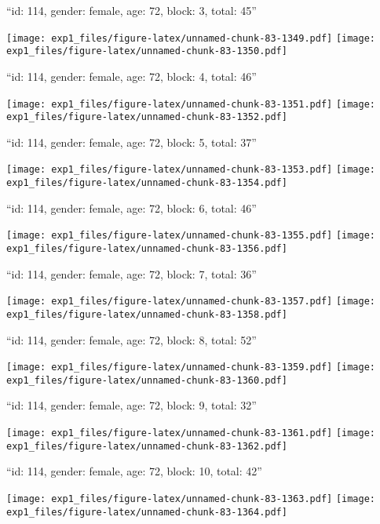 \documentclass[11pt,,]{article}
\begin{document}
\newpage
[1] 

``id: 114, gender: female, age: 72, block: 3, total: 45''

\texttt{[image: exp1\_files/figure-latex/unnamed-chunk-83-1349.pdf]}
\texttt{[image: exp1\_files/figure-latex/unnamed-chunk-83-1350.pdf]}

\newpage
[1] 

``id: 114, gender: female, age: 72, block: 4, total: 46''

\texttt{[image: exp1\_files/figure-latex/unnamed-chunk-83-1351.pdf]}
\texttt{[image: exp1\_files/figure-latex/unnamed-chunk-83-1352.pdf]}

\newpage
[1] 

``id: 114, gender: female, age: 72, block: 5, total: 37''

\texttt{[image: exp1\_files/figure-latex/unnamed-chunk-83-1353.pdf]}
\texttt{[image: exp1\_files/figure-latex/unnamed-chunk-83-1354.pdf]}

\newpage
[1] 

``id: 114, gender: female, age: 72, block: 6, total: 46''

\texttt{[image: exp1\_files/figure-latex/unnamed-chunk-83-1355.pdf]}
\texttt{[image: exp1\_files/figure-latex/unnamed-chunk-83-1356.pdf]}

\newpage
[1] 

``id: 114, gender: female, age: 72, block: 7, total: 36''

\texttt{[image: exp1\_files/figure-latex/unnamed-chunk-83-1357.pdf]}
\texttt{[image: exp1\_files/figure-latex/unnamed-chunk-83-1358.pdf]}

\newpage
[1] 

``id: 114, gender: female, age: 72, block: 8, total: 52''

\texttt{[image: exp1\_files/figure-latex/unnamed-chunk-83-1359.pdf]}
\texttt{[image: exp1\_files/figure-latex/unnamed-chunk-83-1360.pdf]}

\newpage
[1] 

``id: 114, gender: female, age: 72, block: 9, total: 32''

\texttt{[image: exp1\_files/figure-latex/unnamed-chunk-83-1361.pdf]}
\texttt{[image: exp1\_files/figure-latex/unnamed-chunk-83-1362.pdf]}

\newpage
[1] 

``id: 114, gender: female, age: 72, block: 10, total: 42''

\texttt{[image: exp1\_files/figure-latex/unnamed-chunk-83-1363.pdf]}
\texttt{[image: exp1\_files/figure-latex/unnamed-chunk-83-1364.pdf]}
\end{document}
